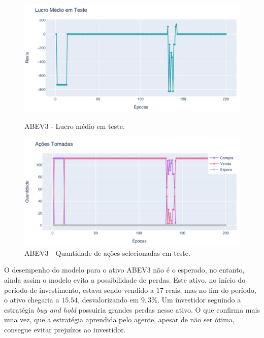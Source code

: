 \begin{figure}[htbp]
    \centering 
    \begin{minipage}[b]{0.45\linewidth}
        \includegraphics[width=\linewidth]{img/ddpg/abev3/clean/profit}
        \caption{ABEV3 - Lucro médio em teste.} 
        \label{abev_clean_profit}
    \end{minipage}
    \quad
    \begin{minipage}[b]{0.45\linewidth}
        \includegraphics[width=\linewidth]{img/ddpg/abev3/clean/actions}
        \caption{ABEV3 - Quantidade de ações selecionadas em teste.}
        \label{abev_clean_act}
    \end{minipage}
\end{figure}

O desempenho do modelo para o ativo ABEV3 não é o esperado, no entanto, ainda assim o modelo evita a possibilidade de perdas. Este ativo, no início do período de investimento, estava sendo vendido a $17$ reais, mas no fim do período, o ativo chegaria a $15.54$, desvalorizando em $9,3\%$. Um investidor seguindo a estratégia \emph{buy and hold} possuiria grandes perdas nesse ativo. O que confirma mais uma vez, que a estratégia aprendida pelo agente, apesar de não ser ótima, consegue evitar prejuízos ao investidor.